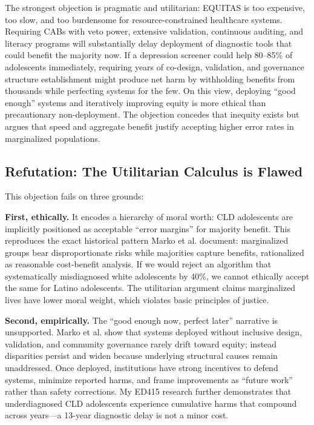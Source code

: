 \documentclass[12pt,a4paper]{article}
\begin{document}
The strongest objection is pragmatic and utilitarian: EQUITAS is too expensive, too slow, and too burdensome for resource-constrained healthcare systems. Requiring CABs with veto power, extensive validation, continuous auditing, and literacy programs will substantially delay deployment of diagnostic tools that could benefit the majority now. If a depression screener could help 80--85\% of adolescents immediately, requiring years of co-design, validation, and governance structure establishment might produce net harm by withholding benefits from thousands while perfecting systems for the few. On this view, deploying ``good enough'' systems and iteratively improving equity is more ethical than precautionary non-deployment. The objection concedes that inequity exists but argues that speed and aggregate benefit justify accepting higher error rates in marginalized populations.

\subsection{Refutation: The Utilitarian Calculus is Flawed}

This objection fails on three grounds:

\textbf{First, ethically.} It encodes a hierarchy of moral worth: CLD adolescents are implicitly positioned as acceptable ``error margins'' for majority benefit. This reproduces the exact historical pattern Marko et al. document: marginalized groups bear disproportionate risks while majorities capture benefits, rationalized as reasonable cost-benefit analysis.\cite{marko2025} If we would reject an algorithm that systematically misdiagnosed white adolescents by 40\%, we cannot ethically accept the same for Latino adolescents. The utilitarian argument claims marginalized lives have lower moral weight, which violates basic principles of justice.\cite{garcia_ed415}

\textbf{Second, empirically.} The ``good enough now, perfect later'' narrative is unsupported. Marko et al. show that systems deployed without inclusive design, validation, and community governance rarely drift toward equity; instead disparities persist and widen because underlying structural causes remain unaddressed.\cite{marko2025} Once deployed, institutions have strong incentives to defend systems, minimize reported harms, and frame improvements as ``future work'' rather than safety corrections. My ED415 research further demonstrates that underdiagnosed CLD adolescents experience cumulative harms that compound across years—a 13-year diagnostic delay is not a minor cost.\cite{garcia_ed415}
\end{document}
